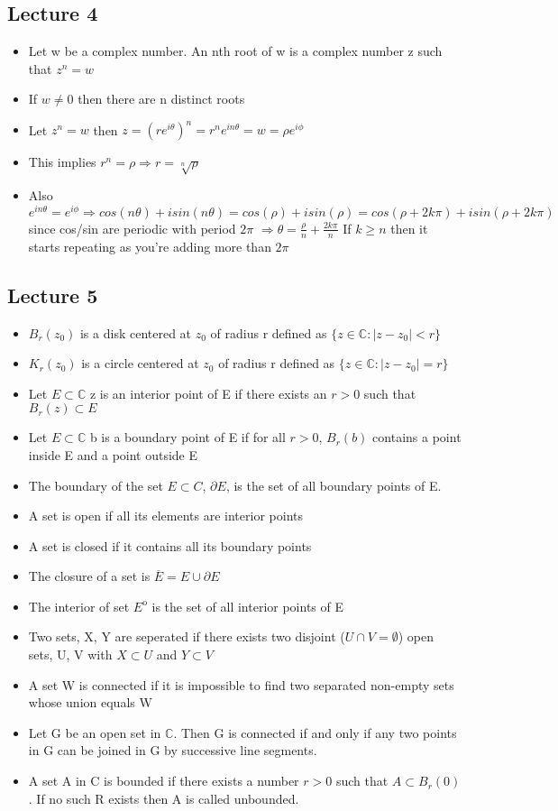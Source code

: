 \documentclass[a4paper]{article}
\begin{document}
\subsection{Lecture 4}
\begin{itemize}
\item Let w be a complex number. An nth root of w is a complex number z such that $z^n = w$
\item If $w \neq 0$ then there are n distinct roots
\item Let $z^n = w$ then $z=(re^{i\theta})^n = r^ne^{in\theta} = w = \rho e^{i\phi}$
\item This implies $r^n = \rho \Rightarrow r = \sqrt[n]{\rho}$ 
\item Also $e^{in\theta} = e^{i\phi} \Rightarrow cos(n\theta) + i sin(n\theta) = cos(\rho) + isin(\rho) = cos(\rho + 2k\pi) + isin(\rho + 2k\pi)$ since cos/sin are periodic with period $2\pi$ $ \Rightarrow \theta = \frac{\rho}{n} + \frac{2k\pi}{n}$ If $k \geq n$ then it starts repeating as you're adding more than $2 \pi$
\end{itemize} 

\subsection{Lecture 5}
\begin{itemize}
\item $B_r(z_0)$ is a disk centered at $z_0$ of radius r defined as $\{z \in \mathbb{C} : |z - z_0| < r\}$
\item $K_r(z_0)$ is a circle centered at $z_0$ of radius r defined as $\{z \in \mathbb{C} : |z - z_0| = r\}$
\item Let $E \subset \mathbb{C}$ z is an interior point of E if there exists an $r > 0$ such that $B_r(z) \subset E$
\item Let $E \subset \mathbb{C}$ b is a boundary point of E if for all $r > 0$, $B_r(b)$ contains a point inside E and a point outside E
\item The boundary of the set $E \subset C$, $\partial E$, is the set of all boundary points of E.
\item A set is open if all its elements are interior points
\item A set is closed if it contains all its boundary points
\item The closure of a set is $\overline{E} = E \cup \partial E$
\item The interior of set $E^{\mathrm{o}}$ is the set of all interior points of E
\item Two sets, X, Y are seperated if there exists two disjoint ($U \cap V = \emptyset$) open sets, U, V with $X \subset U$ and  $Y \subset V$
\item A set W is connected if it is impossible to find two separated non-empty sets whose union equals W
\item Let G be an open set in $\mathbb{C}$. Then G is connected if and only if any two points in G can be joined in G by successive line segments.
\item A set A in C is bounded if there exists a number $r > 0$ such that $A \subset B_r(0)$. If no such R exists then A is called unbounded.
\end{itemize} 
\end{document}
